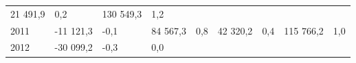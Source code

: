 \begin{longtable}[]{@{}lllllllll@{}}
\begin{minipage}[t]{0.12\columnwidth}
21 491,9\strut
\end{minipage} & \begin{minipage}[t]{0.06\columnwidth}\raggedright
0,2\strut
\end{minipage} & \begin{minipage}[t]{0.08\columnwidth}\raggedright
130 549,3\strut
\end{minipage} & \begin{minipage}[t]{0.06\columnwidth}\raggedright
1,2\strut
\end{minipage}\tabularnewline
\begin{minipage}[t]{0.05\columnwidth}\raggedright
2011\strut
\end{minipage} & \begin{minipage}[t]{0.10\columnwidth}\raggedright
-11 121,3\strut
\end{minipage} & \begin{minipage}[t]{0.06\columnwidth}\raggedright
-0,1\strut
\end{minipage} & \begin{minipage}[t]{0.17\columnwidth}\raggedright
84 567,3\strut
\end{minipage} & \begin{minipage}[t]{0.06\columnwidth}\raggedright
0,8\strut
\end{minipage} & \begin{minipage}[t]{0.12\columnwidth}\raggedright
42 320,2\strut
\end{minipage} & \begin{minipage}[t]{0.06\columnwidth}\raggedright
0,4\strut
\end{minipage} & \begin{minipage}[t]{0.08\columnwidth}\raggedright
115 766,2\strut
\end{minipage} & \begin{minipage}[t]{0.06\columnwidth}\raggedright
1,0\strut
\end{minipage}\tabularnewline
\begin{minipage}[t]{0.05\columnwidth}\raggedright
2012\strut
\end{minipage} & \begin{minipage}[t]{0.10\columnwidth}\raggedright
-30 099,2\strut
\end{minipage} & \begin{minipage}[t]{0.06\columnwidth}\raggedright
-0,3\strut
\end{minipage} & \begin{minipage}[t]{0.17\columnwidth}\raggedright
0,0\strut
\end{minipage} & \begin{minipage}[t]{0.06\columnwidth}\raggedright

\end{minipage}
\end{longtable}
